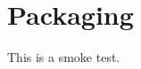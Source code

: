 \documentclass[a4paper,12pt,oneside]{maki-notes}
\begin{document}
\frontmatter
\MakeTitlePage
\tableofcontents

\mainmatter
\chapter{Packaging}
This is a smoke test.
\end{document}
